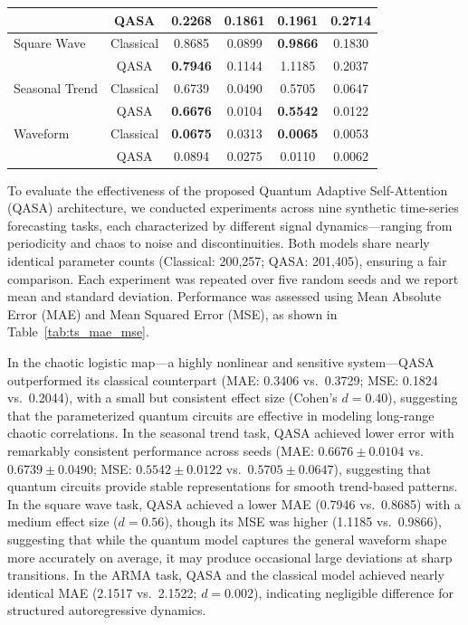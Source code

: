 \documentclass[conference]{IEEEtran}
\begin{document}
\begin{table}[h]
{\begin{tabular}{lccccc}
         & QASA     & 0.2268 & 0.1861 & 0.1961 & 0.2714 \\
\midrule
Square Wave & Classical & 0.8685 & 0.0899 & \textbf{0.9866} & 0.1830 \\
            & QASA     & \textbf{0.7946} & 0.1144 & 1.1185 & 0.2037 \\
\midrule
Seasonal Trend & Classical & 0.6739 & 0.0490 & 0.5705 & 0.0647 \\
               & QASA     & \textbf{0.6676} & 0.0104 & \textbf{0.5542} & 0.0122 \\
\midrule
Waveform & Classical & \textbf{0.0675} & 0.0313 & \textbf{0.0065} & 0.0053 \\
         & QASA     & 0.0894 & 0.0275 & 0.0110 & 0.0062 \\
\bottomrule
\end{tabular}
}
\end{table}

To evaluate the effectiveness of the proposed Quantum Adaptive Self-Attention (QASA) architecture, we conducted experiments across nine synthetic time-series forecasting tasks, each characterized by different signal dynamics---ranging from periodicity and chaos to noise and discontinuities. Both models share nearly identical parameter counts (Classical: 200,257; QASA: 201,405), ensuring a fair comparison. Each experiment was repeated over five random seeds and we report mean and standard deviation. Performance was assessed using Mean Absolute Error (MAE) and Mean Squared Error (MSE), as shown in Table~\ref{tab:ts_mae_mse}.

In the chaotic logistic map---a highly nonlinear and sensitive system---QASA outperformed its classical counterpart (MAE: 0.3406 vs.\ 0.3729; MSE: 0.1824 vs.\ 0.2044), with a small but consistent effect size (Cohen's $d = 0.40$), suggesting that the parameterized quantum circuits are effective in modeling long-range chaotic correlations. In the seasonal trend task, QASA achieved lower error with remarkably consistent performance across seeds (MAE: $0.6676{\pm}0.0104$ vs.\ $0.6739{\pm}0.0490$; MSE: $0.5542{\pm}0.0122$ vs.\ $0.5705{\pm}0.0647$), suggesting that quantum circuits provide stable representations for smooth trend-based patterns. In the square wave task, QASA achieved a lower MAE (0.7946 vs.\ 0.8685) with a medium effect size ($d = 0.56$), though its MSE was higher (1.1185 vs.\ 0.9866), suggesting that while the quantum model captures the general waveform shape more accurately on average, it may produce occasional large deviations at sharp transitions. In the ARMA task, QASA and the classical model achieved nearly identical MAE (2.1517 vs.\ 2.1522; $d = 0.002$), indicating negligible difference for structured autoregressive dynamics.
\end{document}
